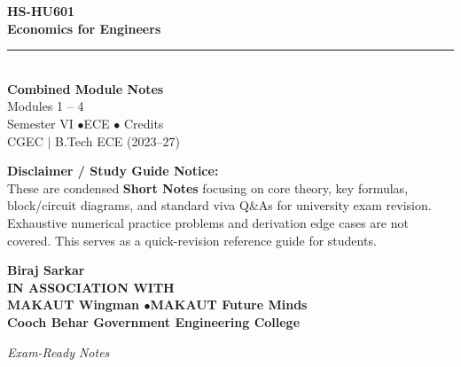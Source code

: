 \documentclass[12pt,a4paper]{article}
\begin{document}
\thispagestyle{empty}


\vspace*{1.0cm}
\begin{center}
  {\Huge\bfseries\color{myred} HS-HU601}\\[10pt]
  {\LARGE\bfseries\color{mydark} Economics for Engineers}\\[20pt]
  {\color{myred}\rule{0.7\linewidth}{1.5pt}}\\[18pt]
  {\Large\color{myteal}\textbf{Combined Module Notes}}\\[8pt]
  {\large\color{mydark} Modules 1 -- 4}\\[40pt]
  {\normalsize\color{mydark} Semester VI \quad$\bullet$\quad ECE \quad$\bullet$ Credits}\\[12pt]
  {\normalsize\color{mydark} CGEC \;$|$\; B.Tech ECE (2023--27)}
\end{center}
\vspace{1.0cm}
\begin{center}
  \begin{tcolorbox}[colback=mygray, colframe=mgframe, boxrule=0.5pt, arc=3pt, width=0.85\linewidth]
    \centering\small\color{mydark}
    \textbf{Disclaimer / Study Guide Notice:}\\
    These are condensed \textbf{Short Notes} focusing on core theory, key formulas, block/circuit diagrams, and standard viva Q\&As for university exam revision. Exhaustive numerical practice problems and derivation edge cases are not covered. This serves as a quick-revision reference guide for students.
  \end{tcolorbox}
\end{center}
\vfill
\vspace{0.6cm}
\begin{center}
  {\large\bfseries\color{mypurple} Biraj Sarkar}\\[16pt]
  {\footnotesize\color{watermark}\textbf{IN ASSOCIATION WITH}}\\[8pt]
  {\small\bfseries\color{mydark} MAKAUT Wingman \quad$\bullet$\quad MAKAUT Future Minds}\\[12pt]
  {\large\bfseries\color{myteal} Cooch Behar Government Engineering College}
\end{center}
\vfill
\begin{center}{\small\color{watermark}\textit{Exam-Ready Notes}}\end{center}
\clearpage
\end{document}
